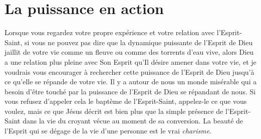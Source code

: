 \section{La puissance en action}


Lorsque vous regardez votre propre expérience 
 et votre relation 
 avec l'Esprit-Saint, si vous ne pouvez pas dire que la dynamique puissante
 de l'Esprit de Dieu jaillit de votre vie comme un fleuve ou comme
 des torrents d'eau vive, alors Dieu a une relation plus pleine
 avec Son Esprit qu'Il désire amener dans votre vie,
 et je voudrais vous encourager à rechercher cette puissance de l'Esprit
 de Dieu jusqu'à ce qu'elle se répande de votre vie.
 Il y a autour de nous un monde misérable qui a besoin d'être touché
 par la puissance de l'Esprit de Dieu se répandant de nous.
 Si vous refusez d'appeler cela le baptème de l'Esprit-Saint,
 appelez-le ce que vous voulez, mais ce que Jésus décrit est bien plus
 que la simple présence de l'Esprit-Saint dans la vie du croyant
 vécue au moment de sa conversion. La beauté de l'Esprit qui se dégage de la vie
 d'une personne est le vrai \emph{charisme}.
\thispagestyle{chapterend}

